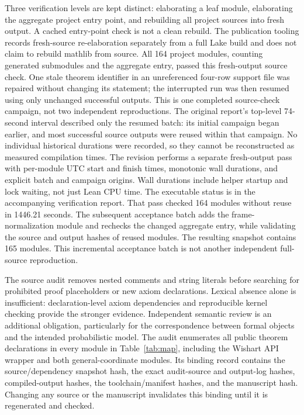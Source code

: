 \documentclass[11pt]{article}
\begin{document}
Three verification levels are kept distinct: elaborating a leaf module,
elaborating the aggregate project entry point, and rebuilding all project
sources into fresh output. A cached entry-point check is not a clean rebuild.
The publication tooling records fresh-source re-elaboration separately from
a full Lake build and does not claim to rebuild mathlib from source.
All 164 project modules, counting generated submodules and the aggregate entry,
passed this fresh-output source check. One stale theorem identifier in an
unreferenced four-row support file was repaired without changing its statement;
the interrupted run was then resumed using only unchanged successful outputs.
This is one completed source-check campaign, not two independent reproductions.
The original report's top-level 74-second interval described only the resumed
batch: its initial campaign began earlier, and most successful source outputs
were reused within that campaign. No individual historical durations were
recorded, so they cannot be reconstructed as measured compilation times.
The revision performs a separate fresh-output pass with per-module UTC start
and finish times, monotonic wall durations, and explicit batch and campaign
origins. Wall durations include helper startup and lock waiting, not just
Lean CPU time. The executable status is in the accompanying verification report.
That pass checked 164 modules without reuse in 1446.21 seconds. The subsequent
acceptance batch adds the frame-normalization module and rechecks the changed
aggregate entry, while validating the source and output hashes of reused
modules. The resulting snapshot contains 165 modules. This incremental
acceptance batch is not another independent full-source reproduction.

The source audit removes nested comments and string literals before searching
for prohibited proof placeholders or new axiom declarations. Lexical absence
alone is insufficient: declaration-level axiom dependencies and reproducible
kernel checking provide the stronger evidence. Independent semantic review
is an additional obligation, particularly for the correspondence between
formal objects and the intended probabilistic model.
The audit enumerates all public theorem declarations in every module in
Table~\ref{tab:map}, including the Wishart API wrapper and both general-coordinate
modules. Its binding record contains the source/dependency snapshot hash,
the exact audit-source and output-log hashes, compiled-output hashes, the
toolchain/manifest hashes, and the manuscript hash. Changing any source or
the manuscript invalidates this binding until it is regenerated and checked.
\end{document}
